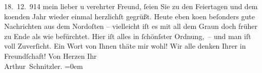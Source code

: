\begin{ledgroupsized}[t]{13cm}
           \pstart
           \raggedleft{}{\pb}18. 12. 914\pend
           \pstart
           mein lieber u verehrter Freund, ſeien Sie zu den Feiertagen und dem
                  ko{\geminationm}enden Jahr wieder einmal herzlichſt gegrüßt. Heute
               eben ko{\geminationm}en beſonders gute Nachrichten aus dem Nordoſten
               – vielleicht iſt es mit all dem Graun doch früher zu Ende als wie befürchtet. Hier
               iſt alles in ſchönſster Ordnung, – und man iſt voll Zuverſicht. Ein Wort von Ihnen
               thäte mir wohl! Wir alle {\pb}denken Ihrer in
               Freundſchaft!\pend
           \pstart
           Von Herzen Ihr{\\[\baselineskip]}\spacefill\mbox{Arthur Schnitzler.}\pend
           \leftskip=0em{}
         
         \endnumbering{}\end{ledgroupsized}  \newcommand{\dateiname}{L02200}\newcommand{\titel}{Arthur Schnitzler an Georg Brandes, 18. 12. 1914}\newcommand{\editorInnen}{Martin Anton Müller und Gerd-Hermann Susen}
      